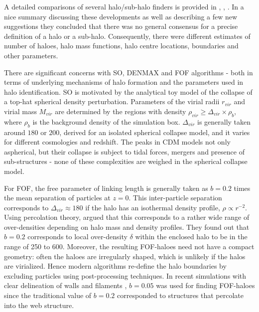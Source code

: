 \documentclass[fleqn,usenatbib,useAMS]{mnras}
\begin{document}

A detailed comparisons of several halo/sub-halo finders is provided in \cite{Knebe2011a}, \cite{Knebe2013}, \cite{Onions2012}. In a nice summary discussing  these developments as well as describing a few new suggestions they  concluded that there was no general consensus for a precise definition of a halo or a sub-halo. Consequently, there were different estimates of number of haloes, halo mass functions, halo centre locations, boundaries and other parameters. 



There are significant concerns with SO, DENMAX and FOF algorithms - both in terms of underlying mechanisms of halo formation and the parameters used in halo identification. SO is motivated by the analytical toy model of the collapse of a top-hat spherical density perturbation. Parameters of the virial radii $r_{vir}$ and virial mass $M_{vir}$ are determined by the regions with density $\rho_{vir} \geq \Delta_{vir} \times \rho_b$, where $\rho_b$ is the background density of the simulation box. $\Delta_{vir}$ is generally taken around $180$ or $200$, derived for an isolated spherical collapse model, and it varies for different cosmologies and redshift. The peaks in CDM models  not only aspherical, but their collapse is subject to tidal forces, mergers and presence of sub-structures - none of these complexities are weighed in the spherical collapse model. 


For FOF, the free parameter of linking length is generally taken as $b = 0.2$ times the mean separation of particles at $z=0$. This inter-particle separation corresponds to $\Delta_{vir} \approx 180$ if the halo has an isothermal density profile, $\rho \propto r^{-2}$. Using percolation theory, \cite{More2011} argued that this corresponds to a rather wide range of over-densities depending on halo mass and density profiles. They found out that $b = 0.2$ corresponds to local over-density $\delta$ within the enclosed halo to be in the range of 250 to 600. Moreover, the resulting FOF-haloes need not have a compact geometry: often the haloes are irregularly shaped, which is unlikely if the halos are virialized.
Hence modern algorithms re-define the halo boundaries by excluding particles using post-processing techniques. In recent simulations with clear delineation of walls and filaments \cite{Angulo2013a}, $b=0.05$ was used for finding FOF-haloes since the traditional value of $b = 0.2$ corresponded to structures that percolate into the web structure.
\end{document}
